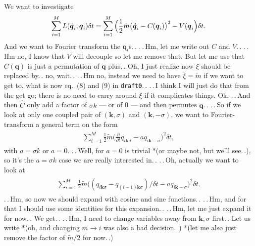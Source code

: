 \documentclass{report}
\newcommand{\bsacc}[3]{#1{\boldsymbol{#2}\hspace{#3em}}\hspace{-#3em}}
\newcommand{\dotbsq}{{\bsacc{\dot}{q}{.15}}}
\begin{document}
We want to investigate
\begin{align}
\begin{aligned}
	\sum_{i=1}^{M} L(\dotbsq_i, \boldsymbol{q}_i) \delta t = 
		\sum_{i=1}^{M} \Big(
			\frac{1}{2}\tilde m \big( \boldsymbol{\dot q}_i - C(\boldsymbol{q}_i)\big)^2 -
			V(\boldsymbol{q}_i
		\Big)\delta t.
\end{aligned}
\end{align}
And we want to Fourier transform the $\boldsymbol{q}_i$s.\,. .\,.\,Hm, let me write out $C$ and $V$.\,. 
.\,.\,Hm no, I know that $V$ will decouple so let me remove that. But let me use that $C(\boldsymbol{q})$ is just a permutation of $\boldsymbol{q}$ plus.\,. Oh, I just realize now $\xi$ should be replaced by.\,. no, wait.\,. .\,.\,Hm no, instead we need to have $\xi=\tilde m$ if we want to get to, what is now eq.\ (8) and (9) in \texttt{draft0}.\,. .\,.\,I think I will just do that from the get go; there is no need to carry around $\xi$ if it complicates things. Ok. .\,.\,And then $\hat C$ only add a factor of $\sigma k$ --- or of 0 --- and then permutes $\boldsymbol{q}$.\,. .\,.\,So if we look at only one coupled pair of $(\boldsymbol{k}, \sigma)$ and $(\boldsymbol{k}, -\sigma)$, we want to Fourier-transform a general term on the form
\begin{align}
\begin{aligned}
	\sum_{i=1}^{M} 
		\frac{1}{2}\tilde m \big( 
			\frac{\partial}{\partial t} q_{i\boldsymbol{k}\sigma} - 
			a q_{i\boldsymbol{k} -\sigma} 
		\big)^2 
		\delta t,
\end{aligned}
\end{align}
with $a = \sigma k$ or $a = 0$. .\,.\,Well, for $a=0$ is trivial *(or maybe not, but we'll see.\,.), so it's the $a = \sigma k$ case we are really interested in.\,. .\,.\,Oh, actually we want to look at
\begin{align}
\begin{aligned}
	\sum_{i=1}^{M} 
		\frac{1}{2}\tilde m \big( 
			(q_{i\boldsymbol{k}\sigma} - q_{(i-1)\boldsymbol{k}\sigma}) / \delta t - 
			a q_{i\boldsymbol{k} -\sigma} 
		\big)^2 
		\delta t.
\end{aligned}
\end{align}
.\,.\,Hm, so now we should expand with cosine and sine functions.\,. .\,.\,Hm, and for that I should use some identities for this expansion.\,. .\,.\,Hm, let me just expand it for now.\,. We get.\,. .\,.\,Hm, I need to change variables away from $\boldsymbol{k},\sigma$ first.\,. Let us write *(oh, and changing $m\to i$ was also a bad decision.\,.) *(let me also just remove the factor of $\tilde m / 2$ for now.\,.)
\end{document}
